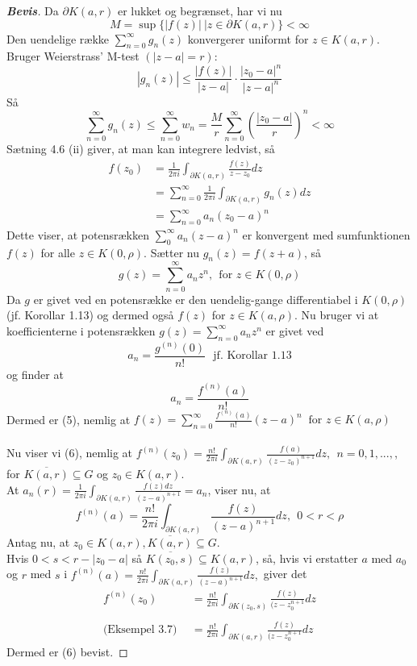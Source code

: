\documentclass[10pt,a4paper]{article}
\theoremstyle{definition}
\begin{document}
\begin{proof}[\textbf{Bevis}]
Da $\partial K(a,r)$ er lukket og begrænset, har vi nu
$$M= \sup \{ \left| f(z) \right|  \ | z \in \partial K(a,r) \} < \infty$$
Den uendelige række $\sum_{n=0}^\infty g_n(z)$ konvergerer uniformt for $z \in K(a,r)$. \\
Bruger Weierstrass' M-test $(\left| z-a \right| = r)$:
$$\left| g_n(z) \right| \leq \frac{|f(z)|}{|z-a|} \cdot \frac{|z_0-a|^n}{|z-a|^n}$$
Så
$$\sum_{n=0}^\infty g_n(z) \leq \sum_{n=0}^\infty w_n = \frac{M}{r} \sum_{n=0}^\infty \left( \frac{|z_0-a|}{r} \right)^n < \infty$$
Sætning 4.6 (ii) giver, at man kan integrere ledvist, så 
\begin{align*}
f(z_0) &= \frac{1}{2\pi i} \int_{\partial K(a,r)} \frac{f(z)}{z-z_0}dz \\
&= \sum_{n=0}^\infty \frac{1}{2 \pi i} \int_{\partial K(a,r)} g_n(z) dz \\
&= \sum_{n=0}^\infty a_n (z_0 - a)^n
\end{align*}
Dette viser, at potensrækken $\sum_0^\infty a_n(z-a)^n$ er konvergent med sumfunktionen $f(z)$ for alle $z \in K(0, \rho)$. Sætter nu $g_n(z) = f (z+a)$, så
$$g(z) = \sum_{n=0}^\infty a_n z^n, \ \ \text{for } z \in K(0,\rho)$$
Da $g$ er givet ved en potensrække er den uendelig-gange differentiabel i $K(0,\rho)$ (jf. Korollar 1.13) og dermed også $f(z)$ for $z \in K(a, \rho)$.
Nu bruger vi at koefficienterne i potensrækken $g(z)=\sum_{n=0}^\infty a_n z^n$ er givet ved
$$a_n= \frac{g^{(n)}(0)}{n!}  \ \ \ \text{jf. Korollar 1.13}$$
og finder at
$$a_n= \frac{f^{(n)}(a)}{n!}$$
Dermed er (5), nemlig at $f(z)= \sum\limits_{n=0}^\infty \frac{f^{(n)}(a)}{n!} (z-a)^n \ \text{ for } z \in K(a,\rho)$ \\ \\
Nu viser vi (6), nemlig at $f^{(n)}(z_0) = \frac{n!}{2 \pi i} \int_{\partial K(a,r)} \frac{f(a)}{(z-z_0)^{n+1}} dz, \ \ n = 0, 1, ...,$, for $\overline{K(a,r)} \subseteq G$ og $z_0 \in K(a,r)$. \\

At $ a_n (r) = \frac{1}{2 \pi i} \int_{\partial K(a,r)} \frac{f(z) dz}{(z-a)^{n+1}}=a_n $, viser nu, at
$$f^{(n)}(a) = \frac{n!}{2 \pi i} \int_{\partial K(a,r)} \frac{f(z)}{(z-a)^{n+1}}dz, \ \ 0<r<\rho$$
Antag nu, at $z_0 \in K(a,r), \overline{K(a,r)} \subseteq G$. \\
Hvis $0<s<r-|z_0-a|$ så $\overline{K(z_0,s)} \subseteq K(a,r)$, så, hvis vi erstatter $a$ med $a_0$ og $r$ med $s$ i $f^{(n)}(a) = \frac{n!}{2 \pi i} \int_{\partial K(a,r)} \frac{f(z)}{(z-a)^{n+1}}dz,$ giver det
\begin{align*}
f^{(n)}(z_0) &= \frac{n!}{2 \pi i} \int_{\partial K(z_0,s)} \frac{f(z)}{(z-z_0^{n+1}}dz \\ \\
\text{(Eksempel 3.7)} \ \ &= \frac{n!}{2 \pi i} \int_{\partial K(a,r)} \frac{f(z)}{(z-z_0^{n+1}}dz
\end{align*}
Dermed er (6) bevist.
\end{proof}
\end{document}
